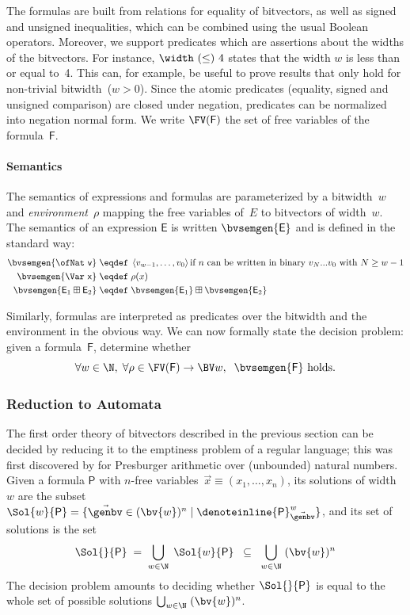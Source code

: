 The formulas are built from relations for equality of bitvectors, as well as
signed and unsigned inequalities, which can be combined using the usual Boolean
operators.
%
Moreover, we support predicates which are assertions about the widths of the bitvectors.
For instance, $\width~{(\leq)}~4$ states that the width $w$
is less than or equal to~4. This can, for example, be useful to prove results
that only hold for non-trivial bitwidth~($w > 0$).
%
Since the atomic predicates (equality, signed and unsigned comparison) are
closed under negation, predicates can be normalized into negation normal form.
%
We write $\FV(\mathsf F)$ the set of free variables of the formula~$\mathsf F$.


\paragraph{Semantics}
The semantics of expressions and formulas are parameterized by a bitwidth~$w$
and \emph{environment}~$\rho$ mapping the free variables of~$E$ to bitvectors of width~$w$.
%
The semantics of an expression $\mathsf{E}$ is written $\bvsemgen{\mathsf{E}}$
and is defined in the standard way:
%
\begin{align*}
  \bvsemgen{\mathsf{\ofNat~v}} \;&\eqdef\; \left< v_{w-1}, \dots, v_0 \right>
  \text{if~$n$ can be written in binary $v_N...v_0$ with $N \geq w-1$}\\
  \bvsemgen{\mathsf{\Var~x}} \;&\eqdef\; \rho(x)\\
  \bvsemgen{\mathsf{E}_1 \boxplus \mathsf{E}_2} \;&\eqdef\;
    \bvsemgen{\mathsf{E}_1} \boxplus \bvsemgen{\mathsf{E}_2}
\end{align*}

\noindent
Similarly, formulas are interpreted as predicates over the bitwidth and the
environment in the obvious way.
%
We can now formally state the decision problem: given a formula~$\mathsf F$,
determine whether
\[
  \forall w \in \N,\; \forall \rho \in \FV(\mathsf F) \to \BV w,\;\; \bvsemgen{\mathsf F} \text{ holds}.
\]

\subsubsection{Reduction to Automata}
\label{sec:swbv:reduction-to-automata}

The first order theory of bitvectors described in the previous section can be
decided by reducing it to the emptiness problem of a regular language; this was
first discovered by \citet{Büchi1960} for Presburger arithmetic over (unbounded)
natural numbers.
%
Given a formula $\mathsf{P}$ with $n$-free variables~$\vec{x} \equiv (x_1, \dots, x_n)$,
its solutions of
width~$w$ are the subset $\Sol{w}{\mathsf{P}} = \{ \vec\genbv \in (\bv{w})^n \mid
\denoteinline{\mathsf{P}}^w_{\vec\genbv} \}$, and its set of solutions is the set
%
\[
  \Sol{}{\mathsf{P}} \;=\; \bigcup_{w \in \N}\; \Sol{w}{\mathsf{P}}
  \;\;\subseteq\;\;
  \bigcup_{w \in \N}\; (\bv{w})^n
\]
%
The decision problem amounts to deciding whether $\Sol{}{\mathsf{P}}$ is equal
to the whole set of possible solutions $\bigcup_{w \in \N}\; (\bv{w})^n$.

